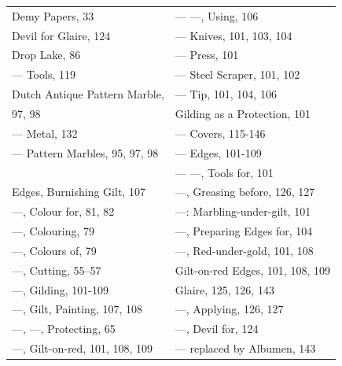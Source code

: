 \documentclass[twoside]{book}
\begin{document}
\begin{center}
\begin{tiny}
\begin{tabular}{l|l}
Demy Papers, 33                  & --- ---, Using, 106                  \\
Devil for Glaire, 124            & --- Knives, 101, 103, 104            \\
Drop Lake, 86                    & --- Press, 101                       \\
--- Tools, 119                   & --- Steel Scraper, 101, 102          \\
Dutch Antique Pattern Marble,    & --- Tip, 101, 104, 106               \\
    97, 98                       & Gilding as a Protection, 101         \\
--- Metal, 132                   & --- Covers, 115-146                  \\
--- Pattern Marbles, 95, 97, 98  & --- Edges, 101-109                   \\
                                 & --- ---, Tools for, 101              \\
Edges, Burnishing Gilt, 107      & ---, Greasing before, 126, 127       \\
---, Colour for, 81, 82          & ---: Marbling-under-gilt, 101        \\
---, Colouring, 79               & ---, Preparing Edges for, 104        \\
---, Colours of, 79              & ---, Red-under-gold, 101, 108        \\
---, Cutting, 55--57             & Gilt-on-red Edges, 101, 108, 109     \\
---, Gilding, 101-109            & Glaire, 125, 126, 143                \\
---, Gilt, Painting, 107, 108    & ---, Applying, 126, 127              \\
---, ---, Protecting, 65         & ---, Devil for, 124                  \\
---, Gilt-on-red, 101, 108, 109  & --- replaced by Albumen, 143         \\

\end{tabular}

\pagebreak

\begin{tabular}{l|l}


\end{tabular}
\end{tiny}
\end{center}
\end{document}
